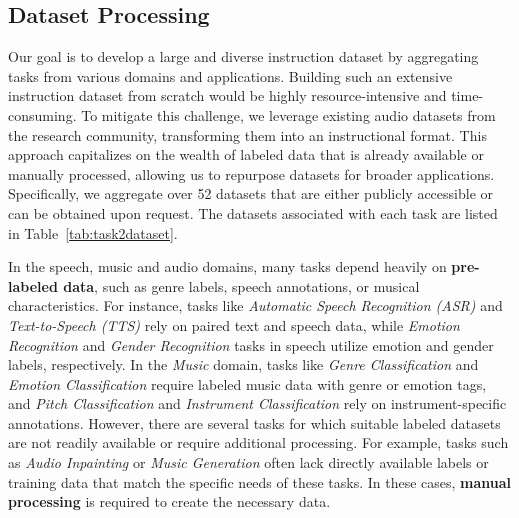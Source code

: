 \subsection{Dataset Processing}

Our goal is to develop a large and diverse instruction dataset by aggregating tasks from various domains and applications. Building such an extensive instruction dataset from scratch would be highly resource-intensive and time-consuming. To mitigate this challenge, we leverage existing audio datasets from the research community, transforming them into an instructional format. This approach capitalizes on the wealth of labeled data that is already available or manually processed, allowing us to repurpose datasets for broader applications. Specifically, we aggregate over 52 datasets that are either publicly accessible or can be obtained upon request. The datasets associated with each task are listed in Table~\ref{tab:task2dataset}.

In the speech, music and audio domains, many tasks depend heavily on \textbf{pre-labeled data}, such as genre labels, speech annotations, or musical characteristics. For instance, tasks like \textit{Automatic Speech Recognition (ASR)} and \textit{Text-to-Speech (TTS)} rely on paired text and speech data, while \textit{Emotion Recognition} and \textit{Gender Recognition} tasks in speech utilize emotion and gender labels, respectively. In the \textit{Music} domain, tasks like \textit{Genre Classification} and \textit{Emotion Classification} require labeled music data with genre or emotion tags, and \textit{Pitch Classification} and \textit{Instrument Classification} rely on instrument-specific annotations. 
However, there are several tasks for which suitable labeled datasets are not readily available or require additional processing. For example, tasks such as \textit{Audio Inpainting} or \textit{Music Generation} often lack directly available labels or training data that match the specific needs of these tasks. In these cases, \textbf{manual processing} is required to create the necessary data.


